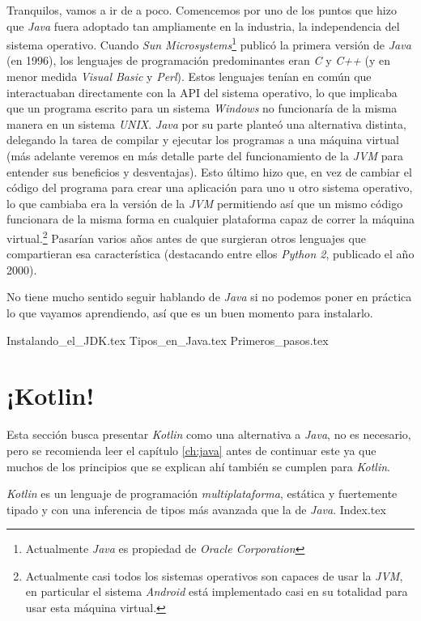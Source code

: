     Tranquilos, vamos a ir de a poco.
    Comencemos por uno de los puntos que hizo que \textit{Java} fuera adoptado tan ampliamente en la
    industria, la independencia del sistema operativo.
    Cuando \textit{Sun Microsystems}\footnote{Actualmente \textit{Java} es propiedad de 
    \textit{Oracle Corporation}} publicó la primera versión de \textit{Java} (en 1996), los 
    lenguajes de programación predominantes eran \textit{C} y \textit{C++} (y en menor medida 
    \textit{Visual Basic} y \textit{Perl}).
    Estos lenguajes tenían en común que interactuaban directamente con la API del sistema operativo,
    lo que implicaba que un programa escrito para un sistema \textit{Windows} no funcionaría de la
    misma manera en un sistema \textit{UNIX}.
    \textit{Java} por su parte planteó una alternativa distinta, delegando la tarea de compilar y 
    ejecutar los programas a una máquina virtual (más adelante veremos en más detalle parte del 
    funcionamiento de la \textit{JVM} para entender sus beneficios y desventajas).
    Esto último hizo que, en vez de cambiar el código del programa para crear una aplicación para 
    uno u otro sistema operativo, lo que cambiaba era la versión de la \textit{JVM} permitiendo así
    que un mismo código funcionara de la misma forma en cualquier plataforma capaz de correr la 
    máquina virtual.\footnote{Actualmente casi todos los sistemas operativos son capaces de usar la 
    \textit{JVM}, en particular el sistema \textit{Android} está implementado casi en su totalidad 
    para usar esta máquina virtual.}
    Pasarían varios años antes de que surgieran otros lenguajes que compartieran esa característica
    (destacando entre ellos \textit{Python 2}, publicado el año 2000).

    No tiene mucho sentido seguir hablando de \textit{Java} si no podemos poner en práctica lo que 
    vayamos aprendiendo, así que es un buen momento para instalarlo.
    
    {Instalando_el_JDK.tex}
    {Tipos_en_Java.tex}
    {Primeros_pasos.tex}
  
    \nocite{*}
    \printbibliography[keyword=java]
  
  \chapter{¡Kotlin!}
    Esta sección busca presentar \textit{Kotlin} como una alternativa a \textit{Java}, no es 
    necesario, pero se recomienda leer el capítulo \ref{ch:java} antes de continuar este ya que 
    muchos de los principios que se explican ahí también se cumplen para \textit{Kotlin}.
    
    \textit{Kotlin} es un lenguaje de programación \textit{multiplataforma}, estática y fuertemente 
    tipado y con una inferencia de tipos más avanzada que la de \textit{Java}.
  {Index.tex}